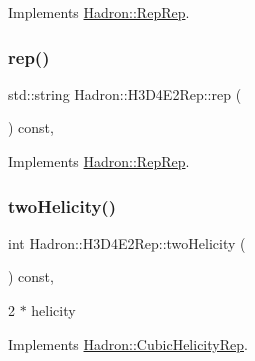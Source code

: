 Implements \mbox{\hyperlink{structHadron_1_1RepRep_ab3213025f6de249f7095892109575fde}{Hadron\+::\+Rep\+Rep}}.

\mbox{\label{structHadron_1_1H3D4E2Rep_ab0cffc17ffd30d135328751bad30c549}} 
\subsubsection{\texorpdfstring{rep()}{rep()}\hspace{0.1cm}{\footnotesize\ttfamily [5/5]}}
{\footnotesize\ttfamily std\+::string Hadron\+::\+H3\+D4\+E2\+Rep\+::rep (\begin{DoxyParamCaption}{ }\end{DoxyParamCaption}) const\hspace{0.3cm}{\ttfamily [inline]}, {\ttfamily [virtual]}}



Implements \mbox{\hyperlink{structHadron_1_1RepRep_ab3213025f6de249f7095892109575fde}{Hadron\+::\+Rep\+Rep}}.

\mbox{\label{structHadron_1_1H3D4E2Rep_ae31f919f05b46798018cf3eb99816051}} 
\subsubsection{\texorpdfstring{twoHelicity()}{twoHelicity()}\hspace{0.1cm}{\footnotesize\ttfamily [1/3]}}
{\footnotesize\ttfamily int Hadron\+::\+H3\+D4\+E2\+Rep\+::two\+Helicity (\begin{DoxyParamCaption}{ }\end{DoxyParamCaption}) const\hspace{0.3cm}{\ttfamily [inline]}, {\ttfamily [virtual]}}

2 $\ast$ helicity 

Implements \mbox{\hyperlink{structHadron_1_1CubicHelicityRep_af507aa56fc2747eacc8cb6c96db31ecc}{Hadron\+::\+Cubic\+Helicity\+Rep}}.

\mbox{\label{structHadron_1_1H3D4E2Rep_ae31f919f05b46798018cf3eb99816051}} 
